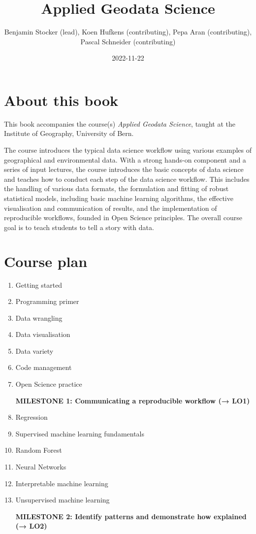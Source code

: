 \documentclass[
]{book}
\title{Applied Geodata Science}
\author{Benjamin Stocker (lead), Koen Hufkens (contributing), Pepa Aran (contributing), Pascal Schneider (contributing)}
\date{2022-11-22}
\begin{document}
\maketitle

{
\setcounter{tocdepth}{1}
\tableofcontents
}
\hypertarget{about-this-book}{%
\chapter*{About this book}\label{about-this-book}}

This book accompanies the course(s) \emph{Applied Geodata Science}, taught at the Institute of Geography, University of Bern.

The course introduces the typical data science workflow using various examples of geographical and environmental data. With a strong hands-on component and a series of input lectures, the course introduces the basic concepts of data science and teaches how to conduct each step of the data science workflow. This includes the handling of various data formats, the formulation and fitting of robust statistical models, including basic machine learning algorithms, the effective visualisation and communication of results, and the implementation of reproducible workflows, founded in Open Science principles. The overall course goal is to teach students to tell a story with data.

\hypertarget{course-plan}{%
\chapter*{Course plan}\label{course-plan}}

\begin{enumerate}
\def\labelenumi{\arabic{enumi}.}
\item
  Getting started
\item
  Programming primer
\item
  Data wrangling
\item
  Data visualisation
\item
  Data variety
\item
  Code management
\item
  Open Science practice

  \textbf{MILESTONE 1: Communicating a reproducible workflow (→ LO1)}
\item
  Regression
\item
  Supervised machine learning fundamentals
\item
  Random Forest
\item
  Neural Networks
\item
  Interpretable machine learning
\item
  Unsupervised machine learning

  \textbf{MILESTONE 2: Identify patterns and demonstrate how explained (→ LO2)}
\end{enumerate}
\end{document}
